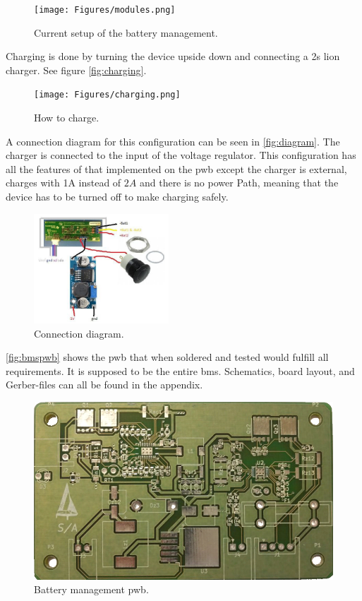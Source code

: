 \begin{figure}[H]
	\centering
	\texttt{[image: Figures/modules.png]}
	\caption{Current setup of the battery management.}
	\label{fig:modules}
\end{figure}


Charging is done by turning the device upside down and connecting a \gls{2s} \gls{lion} charger. See figure \autoref{fig:charging}.

\begin{figure}[H]
	\centering
	\texttt{[image: Figures/charging.png]}
	\caption{How to charge.}
	\label{fig:charging}
\end{figure}

A connection diagram for this configuration can be seen in \autoref{fig:diagram}. The charger is connected to the input of the voltage regulator. This configuration has all the features of that implemented on the \gls{pwb} except the charger is external, charges with 1A instead of $2A$ and there is no power Path, meaning that the device has to be turned off to make charging safely.

\begin{figure}[H]
	\centering
	\includegraphics[width=0.45\textwidth]{Figures/diagram.jpg}
	\caption{Connection diagram.}
	\label{fig:diagram}
\end{figure} 

\autoref{fig:bmspwb} shows the \gls{pwb} that when soldered and tested would fulfill all requirements. It is supposed to be the entire \gls{bms}. 
Schematics, board layout, and Gerber-files can all be found in the appendix. %

\begin{figure}[H]
	\centering
	\includegraphics[width=.6\textwidth]{Figures/bmspwb.png}
	\caption{Battery management \gls{pwb}.}
	\label{fig:bmspwb}
\end{figure}